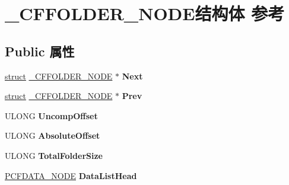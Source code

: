 \hypertarget{struct___c_f_f_o_l_d_e_r___n_o_d_e}{}\section{\+\_\+\+C\+F\+F\+O\+L\+D\+E\+R\+\_\+\+N\+O\+D\+E结构体 参考}
\label{struct___c_f_f_o_l_d_e_r___n_o_d_e}
\subsection*{Public 属性}
\begin{DoxyCompactItemize}
\item 
\mbox{\label{struct___c_f_f_o_l_d_e_r___n_o_d_e_a2446039e09bb3460aae748b7fd5f40d7}} 
\hyperlink{interfacestruct}{struct} \hyperlink{struct___c_f_f_o_l_d_e_r___n_o_d_e}{\+\_\+\+C\+F\+F\+O\+L\+D\+E\+R\+\_\+\+N\+O\+DE} $\ast$ {\bfseries Next}
\item 
\mbox{\label{struct___c_f_f_o_l_d_e_r___n_o_d_e_a122a00e299ff86e95064923ebad18893}} 
\hyperlink{interfacestruct}{struct} \hyperlink{struct___c_f_f_o_l_d_e_r___n_o_d_e}{\+\_\+\+C\+F\+F\+O\+L\+D\+E\+R\+\_\+\+N\+O\+DE} $\ast$ {\bfseries Prev}
\item 
\mbox{\label{struct___c_f_f_o_l_d_e_r___n_o_d_e_a0ec5b6c2ddd6434ddee859bcc7655cf4}} 
U\+L\+O\+NG {\bfseries Uncomp\+Offset}
\item 
\mbox{\label{struct___c_f_f_o_l_d_e_r___n_o_d_e_ab5e385eee60bf7297a07f8308529a88c}} 
U\+L\+O\+NG {\bfseries Absolute\+Offset}
\item 
\mbox{\label{struct___c_f_f_o_l_d_e_r___n_o_d_e_a8583ec3af0c385b43881ff4718b5e611}} 
U\+L\+O\+NG {\bfseries Total\+Folder\+Size}
\item 
\mbox{\label{struct___c_f_f_o_l_d_e_r___n_o_d_e_a18611fcb4b4f1c4b13a4c501b93c63ff}} 
\hyperlink{struct___c_f_d_a_t_a___n_o_d_e}{P\+C\+F\+D\+A\+T\+A\+\_\+\+N\+O\+DE} {\bfseries Data\+List\+Head}
\item 
\mbox{\label{struct___c_f_f_o_l_d_e_r___n_o_d_e_ab31545b8c4fce90a860b07468df8e5a5}} 

\end{DoxyCompactItemize}

